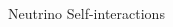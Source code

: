 \documentclass[9pt]{beamer}
\begin{document}
\begin{darkframes}
\begin{frame}{Neutrino Self-interactions}
\begin{columns}[T]
\begin{column}{0.35\textwidth}


   \end{column}

   \begin{column}{0.65\textwidth}


\end{column}
\end{columns}
\end{frame}
\end{darkframes}
\end{document}
